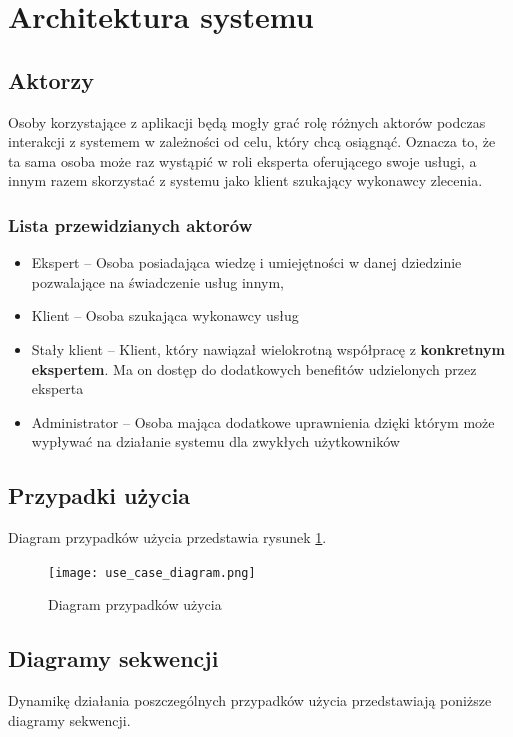 \documentclass[10pt, titlepage, oneside, a4paper]{article}
\begin{document}
	\section{Architektura systemu}
  
  \subsection{Aktorzy}
	Osoby korzystające z aplikacji będą mogły grać rolę różnych aktorów podczas interakcji z systemem w zależności od celu, który chcą osiągnąć.
	Oznacza to, że ta sama osoba może raz wystąpić w roli eksperta oferującego swoje usługi, a innym razem skorzystać z systemu jako klient szukający wykonawcy zlecenia.

	\subsubsection*{Lista przewidzianych aktorów}
	\begin{itemize}
		\item Ekspert -- Osoba posiadająca wiedzę i umiejętności w danej dziedzinie pozwalające na świadczenie usług innym,
		\item Klient -- Osoba szukająca wykonawcy usług
		\item Stały klient -- Klient, który nawiązał wielokrotną współpracę z \textbf{konkretnym ekspertem}. Ma on dostęp do dodatkowych benefitów udzielonych przez eksperta
		\item Administrator -- Osoba mająca dodatkowe uprawnienia dzięki którym może wypływać na działanie systemu dla zwykłych użytkowników
	\end{itemize}
	
  \subsection{Przypadki użycia}
  Diagram przypadków użycia przedstawia rysunek \ref{fig:ucDiagram}.

  \begin{figure}[h]
	  \centering
	  \texttt{[image: use\_case\_diagram.png]}
	  \caption{Diagram przypadków użycia}
	  \label{fig:ucDiagram}
  \end{figure}
	\newpage  
  
  \subsection{Diagramy sekwencji}
	Dynamikę działania poszczególnych przypadków użycia przedstawiają poniższe diagramy sekwencji.
\end{document}
